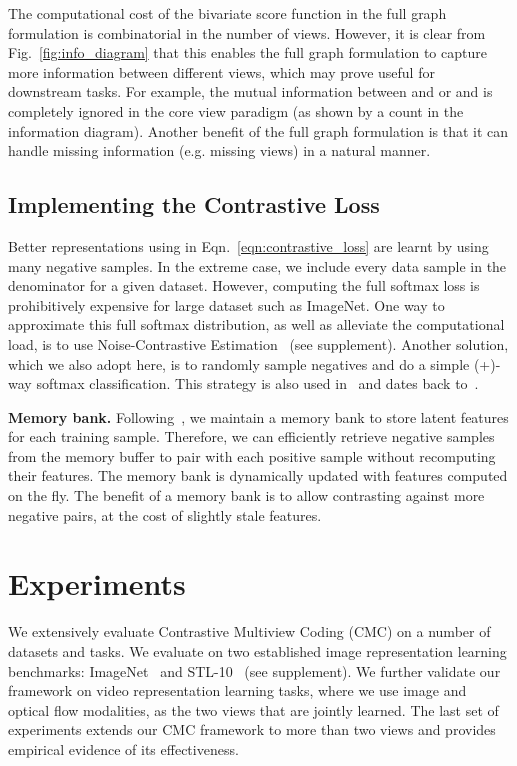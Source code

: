 \documentclass[10pt,twocolumn,letterpaper]{article}
\begin{document}
The computational cost of the bivariate score function in the full graph formulation is combinatorial in the number of views. However, it is clear from Fig.~\ref{fig:info_diagram} that this enables the full graph formulation to capture more information between different views, which may prove useful for downstream tasks. For example, the mutual information between  and  or  and  is completely ignored in the core view paradigm (as shown by a  count in the information diagram). Another benefit of the full graph formulation is that it can handle missing information (e.g. missing views) in a natural manner. \subsection{Implementing the Contrastive Loss}
\label{sec:app_softmax}
Better representations using  in Eqn.~\ref{eqn:contrastive_loss} are learnt by using many negative samples. In the extreme case, we include every data sample in the denominator for a given dataset. However, computing the full softmax loss is prohibitively expensive for large dataset such as ImageNet. One way to approximate this full softmax distribution, as well as alleviate the computational load, is to use Noise-Contrastive Estimation~\cite{gutmann2010noise,wu2018unsupervised} (see supplement). Another solution, which we also adopt here, is to randomly sample  negatives and do a simple (+)-way softmax classification. This strategy is also used in~\cite{bachman2019learning,henaff2019data,he2019momentum} and dates back to~\cite{sohn2016improved}.

\textbf{Memory bank.}
Following~\cite{wu2018unsupervised}, we maintain a memory bank to store latent features for each training sample. Therefore, we can efficiently retrieve  negative samples from the memory buffer to pair with each positive sample without recomputing their features. The memory bank is dynamically updated with features computed on the fly. The benefit of a memory bank is to allow contrasting against more negative pairs, at the cost of slightly stale features. 

  \section{Experiments}
\label{sec:results}
We extensively evaluate Contrastive Multiview Coding (CMC) on a number of datasets and tasks. We evaluate on two established image representation learning benchmarks: ImageNet~\cite{deng2009imagenet} and STL-10~\cite{coates2011analysis} (see supplement). We further validate our framework on video representation learning tasks, where we use image and optical flow modalities, as the two views that are jointly learned. The last set of experiments extends our CMC framework to more than two views and provides empirical evidence of its effectiveness.
\end{document}
